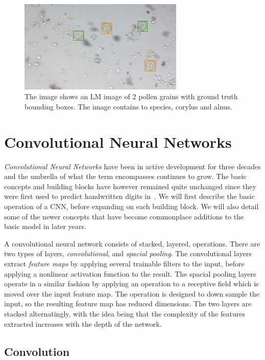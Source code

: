 \begin{figure}[htb]
  \centering
  \includegraphics[width=0.7\textwidth]{figs/GT-Snap-080.png}
  \caption[Bounding boxes]{The image shows an LM image of 2 pollen grains with ground truth bounding boxes.
The image contains to species, \textcolor{corylus}{corylus} and \textcolor{alnus}{alnus}.}\label{fig:bbox}
\end{figure}

\section{Convolutional Neural Networks}
\emph{Convolutional Neural Networks} have been in active development for three decades and the umbrella of what the term encompasses continues to grow.
The basic concepts and building blocks have however remained quite unchanged since they were first used to predict handwritten digits in~\cite{1989Hdrw}.
We will first describe the basic operation of a CNN, before expanding on each building block.
We will also detail some of the newer concepts that have become commonplace additions to the basic model in later years.

A convolutional neural network consists of stacked, layered, operations.
There are two types of layers, \textit{convolutional}, and \textit{spacial pooling}.
The convolutional layers extract \textit{feature maps} by applying several trainable filters to the input, before applying a nonlinear activation function to the result.
The spacial pooling layers operate in a similar fashion by applying an operation to a receptive field which is moved over the input feature map.
The operation is designed to down sample the input, so the resulting feature map has reduced dimensions.
The two layers are stacked alternatingly, with the idea being that the complexity of the features extracted increases with the depth of the network.

\subsection{Convolution}

